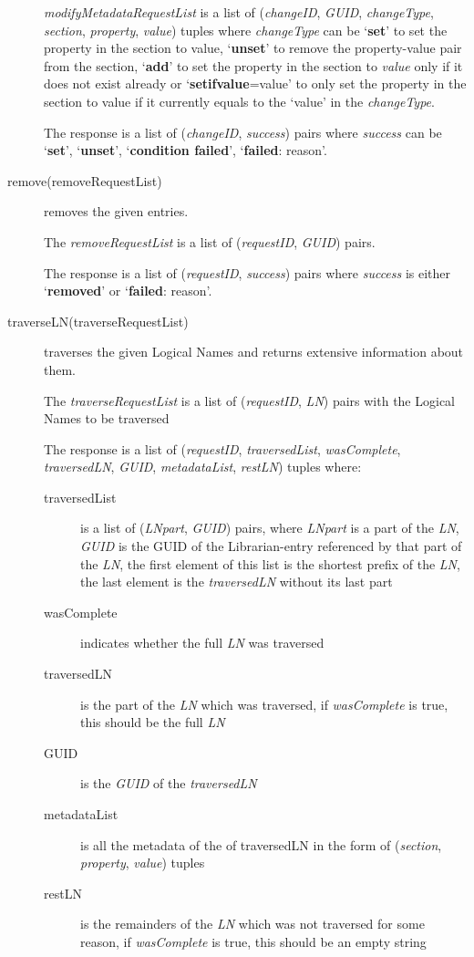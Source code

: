 \documentclass{book}
\begin{document}
\begin{description}
    \emph{modifyMetadataRequestList} is a list of (\emph{changeID}, \emph{GUID}, \emph{changeType}, \emph{section}, \emph{property}, \emph{value}) tuples where \emph{changeType} can be `\textbf{set}' to set the property in the section to value, `\textbf{unset}' to remove the property-value pair from the section, `\textbf{add}' to set the property in the section to \emph{value} only if it does not exist already or `\textbf{setifvalue}=value' to only set the property in the section to value if it currently equals to the `value' in the \emph{changeType}.

    The response is a list of (\emph{changeID}, \emph{success}) pairs where \emph{success} can be `\textbf{set}', `\textbf{unset}', `\textbf{condition failed}', `\textbf{failed}: reason'.
    
    \item [remove(removeRequestList)] removes the given entries.

    The \emph{removeRequestList} is a list of (\emph{requestID}, \emph{GUID}) pairs.
    
    The response is a list of (\emph{requestID}, \emph{success}) pairs where \emph{success} is either `\textbf{removed}' or `\textbf{failed}: reason'.
        
    \item [traverseLN(traverseRequestList)] traverses the given Logical Names and returns extensive information about them.
    
    The \emph{traverseRequestList} is a list of (\emph{requestID}, \emph{LN}) pairs with the Logical Names to be traversed
    
    The response is a list of (\emph{requestID}, \emph{traversedList}, \emph{wasComplete}, \emph{traversedLN}, \emph{GUID}, \emph{metadataList}, \emph{restLN}) tuples where:
    \begin{description}
        \item[traversedList] is a list of (\emph{LNpart}, \emph{GUID}) pairs, where \emph{LNpart} is a part of the \emph{LN}, \emph{GUID} is the GUID of the Librarian-entry referenced by that part of the \emph{LN}, the first element of this list is the shortest prefix of the \emph{LN}, the last element is the \emph{traversedLN} without its last part
        \item[wasComplete] indicates whether the full \emph{LN} was traversed
        \item[traversedLN] is the part of the \emph{LN} which was traversed, if \emph{wasComplete} is true, this should be the full \emph{LN}
        \item[GUID] is the \emph{GUID} of the \emph{traversedLN}
        \item[metadataList] is all the metadata of the of traversedLN in the form of (\emph{section}, \emph{property}, \emph{value}) tuples
        \item[restLN] is the remainders of the \emph{LN} which was not traversed for some reason, if \emph{wasComplete} is true, this should be an empty string
    \end{description}
    

\end{description}
\end{document}
